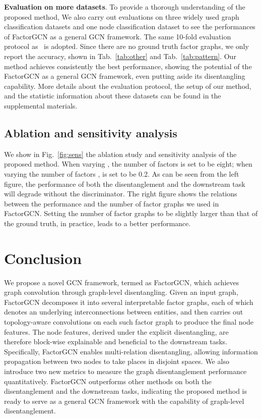 \documentclass{article}
\begin{document}
\textbf{Evaluation on more datasets}. 
To provide a thorough understanding of the proposed method, 
We also carry out evaluations on three widely 
used graph classification datasets and one node classification dataset
to see the performances of FactorGCN as a general GCN framework.
The same 10-fold evaluation protocol
as~\citep{xu2018powerful} is adopted. 
Since there are no ground truth factor graphs, 
we only report the accuracy, shown in 
Tab.~\ref{tab:other} and Tab.~\ref{tab:pattern}. 
Our method achieves consistently the best performance,
showing the potential of the FactorGCN 
as a general GCN framework, even putting aside its
disentangling capability.
More details about the evaluation protocol, 
the setup of our method, and the statistic information about these datasets 
can be found in the supplemental materials.


\subsection{Ablation and sensitivity analysis}

We show in Fig.~\ref{fig:sens} the ablation study and sensitivity analysis
of the proposed method.
When varying , the number of factors 
is set to be eight; 
when varying the number of factors , 
 is set to be 0.2.
As can be seen from the left figure,
the performance of both the disentanglement and the 
downstream task will degrade without the discriminator.
The right figure shows the relations between the performance
and the number of factor graphs we used in FactorGCN.
Setting the number of factor graphs 
to be slightly larger than that of the ground truth,
in practice, leads to a better performance.


\section{Conclusion}
We propose a novel GCN framework, termed as FactorGCN,
which achieves graph convolution through 
graph-level disentangling. Given an input graph, FactorGCN
decomposes it into several interpretable factor graphs, each of which denotes an underlying interconnections
between entities, and then carries out topology-aware convolutions on each such factor graph to produce the final node features. The node features, derived under the explicit disentangling,  are therefore block-wise explainable
and beneficial to the downstream tasks. 
Specifically, FactorGCN enables multi-relation 
disentangling, allowing information propagation
between two nodes to take places 
in disjoint spaces.
We also introduce two new metrics to 
measure the graph disentanglement
performance quantitatively. 
FactorGCN outperforms other methods
on both the disentanglement and the downstream tasks, indicating
the proposed method is ready to serve as a general GCN framework
with the capability of graph-level disentanglement.
\end{document}
